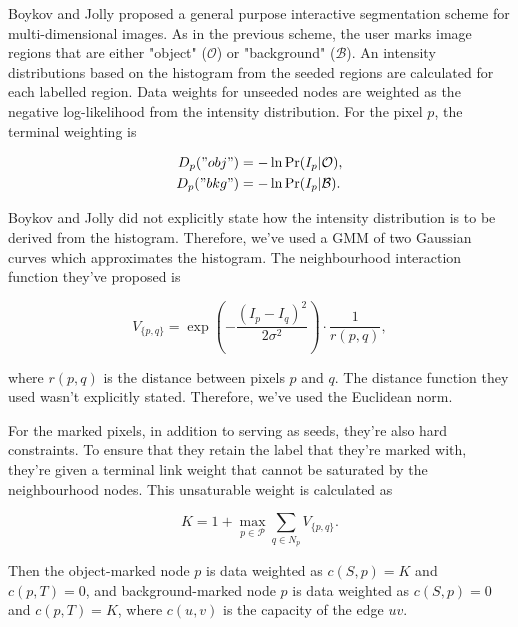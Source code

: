 \begin{definition}
	Boykov and Jolly \citep{Boykov2001_2} proposed a general purpose interactive segmentation scheme for multi-dimensional images. As in the previous scheme, the user marks image regions that are either "object" ($\mathcal{O}$) or "background" ($\mathcal{B}$). An intensity distributions based on the histogram from the seeded regions are calculated for each labelled region. Data weights for unseeded nodes are weighted as the negative log-likelihood from the intensity distribution. For the pixel $p$, the terminal weighting is

\begin{align}
	D_p("obj") &= -\ln\Pr(I_p|\mathcal{O}), \\
	D_p("bkg") &= -\ln\Pr(I_p|\mathcal{B}).
\end{align}

Boykov and Jolly did not explicitly state how the intensity distribution is to be derived from the histogram. Therefore, we've used a GMM of two Gaussian curves which approximates the histogram. The neighbourhood interaction function they've proposed is

\begin{equation}
	V_{\{p,q\}} = \exp\left( -\frac{(I_p-I_q)^2}{2 \sigma^2}\right)\cdot\frac{1}{r(p,q)},
\end{equation}

where $r(p,q)$ is the distance between pixels $p$ and $q$. The distance function they used wasn't explicitly stated. Therefore, we've used the Euclidean norm.

For the marked pixels, in addition to serving as seeds, they're also hard constraints. To ensure that they retain the label that they're marked with, they're given a terminal link weight that cannot be saturated by the neighbourhood nodes. This unsaturable weight is calculated as

\begin{equation}
	K = 1 + \max_{p \in \mathcal{P}}\sum_{q \in N_p}V_{\{p,q\}}.
	\label{eq:hardconstraintweight}
\end{equation}

Then the object-marked node $p$ is data weighted as $c(S,p)=K$ and $c(p,T)=0$, and background-marked node $p$ is data weighted as $c(S,p)=0$ and $c(p,T)=K$, where $c(u,v)$ is the capacity of the edge $uv$.
\end{definition}



